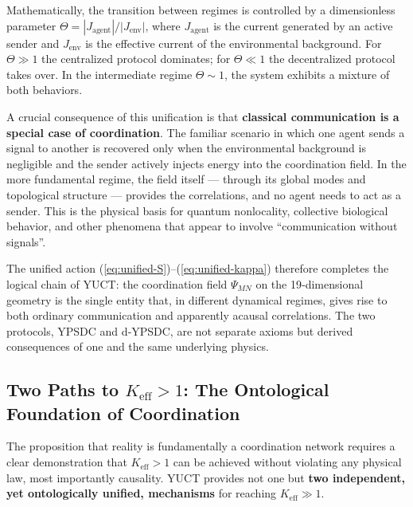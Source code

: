 \documentclass[12pt,a4paper]{article}
\begin{document}
	Mathematically, the transition between regimes is controlled by a dimensionless
	parameter $\Theta = |J_{\mathrm{agent}}| / |J_{\mathrm{env}}|$, where
	$J_{\mathrm{agent}}$ is the current generated by an active sender and
	$J_{\mathrm{env}}$ is the effective current of the environmental background.
	For $\Theta \gg 1$ the centralized protocol dominates; for $\Theta \ll 1$ the
	decentralized protocol takes over. In the intermediate regime
	$\Theta \sim 1$, the system exhibits a mixture of both behaviors.
	
	A crucial consequence of this unification is that \textbf{classical
		communication is a special case of coordination}. The familiar scenario in which
	one agent sends a signal to another is recovered only when the environmental
	background is negligible and the sender actively injects energy into the
	coordination field. In the more fundamental regime, the field itself — through
	its global modes and topological structure — provides the correlations, and no
	agent needs to act as a sender. This is the physical basis for quantum
	nonlocality, collective biological behavior, and other phenomena that appear to
	involve “communication without signals”.
	
	The unified action (\ref{eq:unified-S})–(\ref{eq:unified-kappa}) therefore
	completes the logical chain of YUCT: the coordination field $\Psi_{MN}$ on the
	19‑dimensional geometry is the single entity that, in different dynamical
	regimes, gives rise to both ordinary communication and apparently acausal
	correlations. The two protocols, YPSDC and d‑YPSDC, are not separate axioms
	but derived consequences of one and the same underlying physics.
	
\subsection{Two Paths to \(K_{\mathrm{eff}} > 1\): The Ontological Foundation of Coordination}
\label{subsec:two-paths-ontology}

The proposition that reality is fundamentally a coordination network requires
a clear demonstration that \(K_{\mathrm{eff}} > 1\) can be achieved without
violating any physical law, most importantly causality. YUCT provides not
one but \textbf{two independent, yet ontologically unified, mechanisms} for
reaching \(K_{\mathrm{eff}} \gg 1\).
\end{document}
